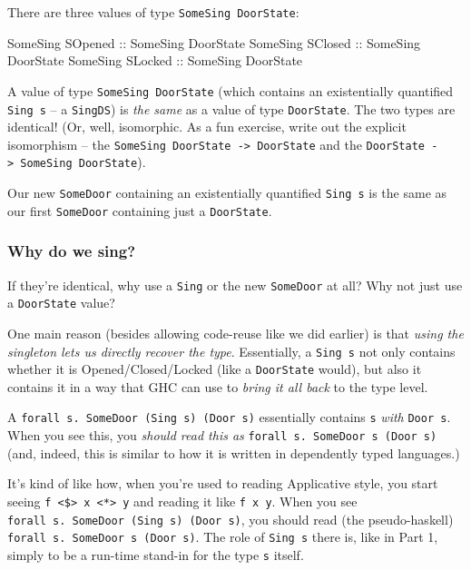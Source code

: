 \documentclass[]{article}
\newenvironment{Shaded}{}{}
\newcommand{\DataTypeTok}[1]{\textcolor[rgb]{0.56,0.13,0.00}{#1}}
\newcommand{\OtherTok}[1]{\textcolor[rgb]{0.00,0.44,0.13}{#1}}
\begin{document}
There are three values of type \texttt{SomeSing\ DoorState}:

\begin{Shaded}
\begin{Highlighting}[]
\DataTypeTok{SomeSing} \DataTypeTok{SOpened}\OtherTok{ ::} \DataTypeTok{SomeSing} \DataTypeTok{DoorState}
\DataTypeTok{SomeSing} \DataTypeTok{SClosed}\OtherTok{ ::} \DataTypeTok{SomeSing} \DataTypeTok{DoorState}
\DataTypeTok{SomeSing} \DataTypeTok{SLocked}\OtherTok{ ::} \DataTypeTok{SomeSing} \DataTypeTok{DoorState}
\end{Highlighting}
\end{Shaded}

A value of type \texttt{SomeSing\ DoorState} (which contains an existentially
quantified \texttt{Sing\ s} -- a \texttt{SingDS}) is \emph{the same} as a value
of type \texttt{DoorState}. The two types are identical! (Or, well, isomorphic.
As a fun exercise, write out the explicit isomorphism -- the
\texttt{SomeSing\ DoorState\ -\textgreater{}\ DoorState} and the
\texttt{DoorState\ -\textgreater{}\ SomeSing\ DoorState}).

Our new \texttt{SomeDoor} containing an existentially quantified
\texttt{Sing\ s} is the same as our first \texttt{SomeDoor} containing just a
\texttt{DoorState}.

\subsubsection{Why do we sing?}\label{why-do-we-sing}

If they're identical, why use a \texttt{Sing} or the new \texttt{SomeDoor} at
all? Why not just use a \texttt{DoorState} value?

One main reason (besides allowing code-reuse like we did earlier) is that
\emph{using the singleton lets us directly recover the type}. Essentially, a
\texttt{Sing\ s} not only contains whether it is Opened/Closed/Locked (like a
\texttt{DoorState} would), but also it contains it in a way that GHC can use to
\emph{bring it all back} to the type level.

A \texttt{forall\ s.\ SomeDoor\ (Sing\ s)\ (Door\ s)} essentially contains
\texttt{s} \emph{with} \texttt{Door\ s}. When you see this, you \emph{should
read this as} \texttt{forall\ s.\ SomeDoor\ s\ (Door\ s)} (and, indeed, this is
similar to how it is written in dependently typed languages.)

It's kind of like how, when you're used to reading Applicative style, you start
seeing \texttt{f\ \textless{}\$\textgreater{}\ x\ \textless{}*\textgreater{}\ y}
and reading it like \texttt{f\ x\ y}. When you see
\texttt{forall\ s.\ SomeDoor\ (Sing\ s)\ (Door\ s)}, you should read (the
pseudo-haskell) \texttt{forall\ s.\ SomeDoor\ s\ (Door\ s)}. The role of
\texttt{Sing\ s} there is, like in Part 1, simply to be a run-time stand-in for
the type \texttt{s} itself.
\end{document}
